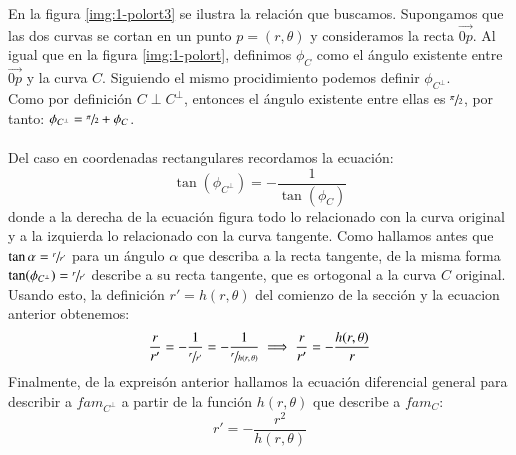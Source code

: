 En la figura \ref{img:1-polort3} se ilustra la relación que buscamos. Supongamos que las dos curvas se cortan en un punto $p = (r, \theta)$ y consideramos la recta $\vec{0p}$. Al igual que en la figura \ref{img:1-polort}, definimos $\phi_C$ como el ángulo existente entre $\vec{0p}$ y la curva $C$. Siguiendo el mismo procidimiento podemos definir $\phi_{C^\perp}$.\\
Como por definición $C \perp C^{\perp}$, entonces el ángulo existente entre ellas es $\sfrac{\pi}{2}$, por tanto: $\phi_{C^\perp} = \sfrac{\pi}{2} + \phi_C$.\\\\
Del caso en coordenadas rectangulares recordamos la ecuación:
$$
\tan(\phi_{C^\perp}) = -\frac{1}{ \tan(\phi_C)}
$$
donde a la derecha de la ecuación figura todo lo relacionado con la curva original y a la izquierda lo relacionado con la curva tangente. Como hallamos antes que $\tan\alpha = \sfrac{r}{r'}$ para un ángulo $\alpha$ que describa a la recta tangente, de la misma forma $\tan(\phi_{C^\perp}) = \sfrac{r}{r'}$ describe a su recta tangente, que es ortogonal a la curva $C$ original.\\ Usando esto, la definición $r' = h(r, \theta)$ del comienzo de la sección y la ecuacion anterior obtenemos:
$$
\frac{r}{r'} = -\frac{1}{\sfrac{r}{r'}} = -\frac{1}{\sfrac{r}{h(r,\theta)}} \implies \frac{r}{r'} = -\frac{h(r,\theta)}{r}
$$
Finalmente, de la expreisón anterior hallamos la ecuación diferencial general para describir a $fam_{C^\perp}$ a partir de la función $h(r, \theta)$ que describe a $fam_C$:
$$
    r' = -\frac{r^2}{h(r, \theta)}
$$
